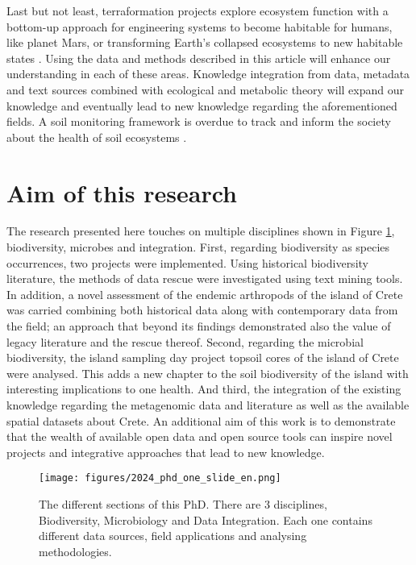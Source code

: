 Last but not least, terraformation
projects explore ecosystem function with a bottom-up approach for engineering
systems to become habitable for humans, like planet Mars, or transforming
Earth's collapsed ecosystems to new habitable states
\parencite{conde-pueyo2020Synthetic}. Using the data and methods described in this
article will enhance our understanding in each of these areas. Knowledge
integration from data, metadata and text sources combined with ecological and
metabolic theory will expand our knowledge and eventually lead to new
knowledge regarding the aforementioned fields. A soil monitoring framework 
is overdue to track and inform the society about the health of 
soil ecosystems \parencite{guerra2021tracking}.

\section{Aim of this research}
\label{sec:aim}

The research presented here touches on multiple disciplines shown in Figure \ref{fig:phd-one-slide}, 
biodiversity, microbes and integration. 
First, regarding biodiversity as species occurrences, two projects were implemented.
Using historical biodiversity literature, the methods of data rescue were 
investigated using text mining tools.
In addition, a novel assessment of the endemic arthropods of the island of Crete
was carried combining both historical data along with contemporary data from the field;
an approach that beyond its findings demonstrated also the value of legacy
literature and the rescue thereof.
Second, regarding the microbial biodiversity, the island sampling day project 
topsoil cores of the island of Crete were analysed. This adds a new chapter to 
the soil biodiversity of the island with interesting implications to one health.
And third, the integration of the existing knowledge regarding the metagenomic 
data and literature as well as the available spatial datasets about Crete. 
An additional aim of this work is to demonstrate that the wealth of available open data
and open source tools can inspire novel projects and integrative approaches that lead
to new knowledge.

   \begin{figure}[ht]
      \centering
      \texttt{[image: figures/2024\_phd\_one\_slide\_en.png]}
      \caption[Graphical abstract of this PhD]{The different sections of this PhD. There are 3 disciplines, Biodiversity, Microbiology and Data Integration. Each one contains different data sources, field applications and analysing methodologies.}
      \label{fig:phd-one-slide}
   \end{figure}


